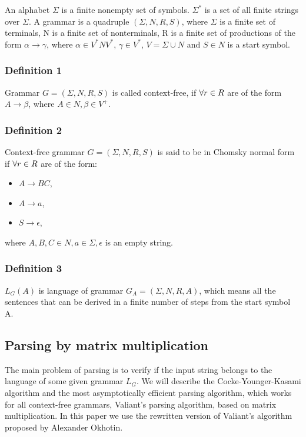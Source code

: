 \documentclass[runningheads]{llncs}
\begin{document}
An alphabet $\Sigma$ is a finite nonempty set of symbols. $\Sigma^{*}$ is a set of all finite strings over $\Sigma$. 
A grammar is a quadruple $(\Sigma, N, R, S)$, where $\Sigma$ is a finite set of terminals, N is a finite set of nonterminals, R is a finite set of productions of the form $\alpha \rightarrow \gamma$, where $\alpha \in V^{*}NV^{*}$, $\gamma \in V^{*}$, $V = \Sigma \cup N$ and $S \in N$ is a start symbol. 

\subsubsection{Definition 1} Grammar $G = (\Sigma, N, R, S)$ is called context-free, if $\space\forall r \in R$ are of the form $A \rightarrow \beta$, where $A \in N, \beta \in V^{+}$. 

\subsubsection{Definition 2} Context-free grammar $G = (\Sigma, N, R, S)$ is said to be in Chomsky normal form if $\space\forall r \in R$ are of the form: 
\begin{itemize}
  \item $A \rightarrow BC$,
  \item $A \rightarrow a$,
  \item $S \rightarrow \epsilon$, 
\end{itemize}
where $A, B, C \in N, a \in \Sigma, \epsilon$ is an empty string. 

\subsubsection{Definition 3} $L_{G}(A)$ is language of grammar $G_{A} = (\Sigma, N, R, A)$, which means all the sentences that can be derived in a finite number of steps from the start symbol A.

\subsection{Parsing by matrix multiplication}
  
The main problem of parsing is to verify if the input string belongs to the language of some given grammar $L_{G}$. We will describe the Cocke-Younger-Kasami algorithm and the most asymptotically efficient parsing algorithm, which works for all context-free grammars, Valiant's parsing algorithm, based on matrix multiplication. In this paper we use the rewritten version of Valiant's algorithm proposed by Alexander Okhotin. 
\end{document}
